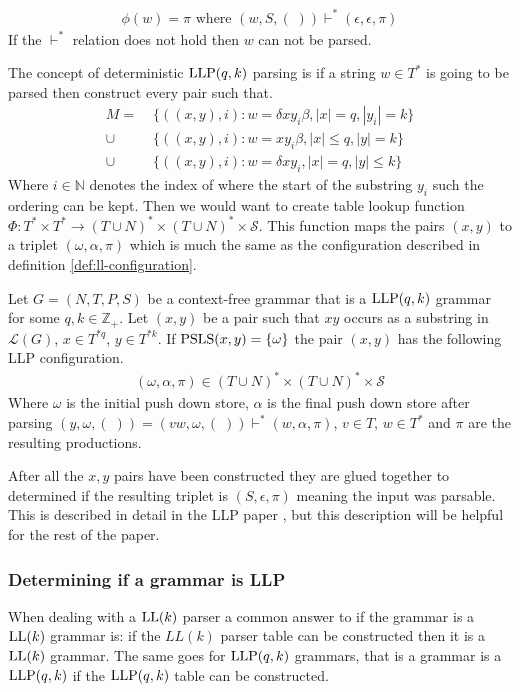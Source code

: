 \begin{align*}
    \phi(w) = \pi \text{ where } (w, S, (\;)) \vdash^* (\epsilon, \epsilon, \pi) 
\end{align*}
If the $\vdash^*$ relation does not hold then $w$ can not be parsed. 

The concept of deterministic $\text{LLP}(q,k)$ parsing is if a string $w \in T^*$ is going to be parsed then construct every pair such that.
\begin{align*}
    M =&\; \{((x, y), i) : w = \delta xy_i \beta, |x| = q, |y_i| = k\} \\
    \cup&\; \{((x, y), i) : w = xy_i \beta, |x| \leq q, |y| = k\} \\
    \cup&\; \{((x, y), i) : w = \delta xy_i, |x| = q, |y| \leq k\}
\end{align*}
Where $i \in \mathbb{N}$ denotes the index of where the start of the substring $y_i$ such the ordering can be kept. Then we would want to create table lookup function $\Phi: T^* \times T^* \to (T \cup N)^* \times (T \cup N)^* \times \mathcal{S}$. This function maps the pairs $(x,y)$ to a triplet $(\omega, \alpha, \pi)$ which is much the same as the configuration described in definition \ref{def:ll-configuration}. 
\begin{definition}
    \label{def:llp-configuration}
    Let $G = (N, T, P, S)$ be a context-free grammar that is a $\text{LLP}(q, k)$ grammar for some $q, k \in \mathbb{Z}_+$. Let $(x, y)$ be a pair such that $xy$ occurs as a substring in $\mathcal{L}(G)$, $x \in T^{*q}$, $y \in T^{*k}$. If $\text{PSLS}(x,y) = \{\omega\}$ the pair $(x, y)$ has the following LLP configuration.
    \begin{align*}
        (\omega, \alpha, \pi) \in (T \cup N)^* \times (T \cup N)^* \times \mathcal{S}
    \end{align*}
    Where $\omega$ is the initial push down store, $\alpha$ is the final push down store after parsing $(y, \omega, (\;)) = (vw, \omega, (\;)) \vdash^* (w, \alpha, \pi)$, $v \in T$, $w \in T^*$ and $\pi$ are the resulting productions.
\end{definition}
\noindent After all the $x, y$ pairs have been constructed they are glued together to determined if the resulting triplet is $(S, \epsilon, \pi)$ meaning the input was parsable. This is described in detail in the LLP paper \cite[7]{Vagner2007}, but this description will be helpful for the rest of the paper.

\subsubsection{Determining if a grammar is LLP}
When dealing with a $\text{LL}(k)$ parser a common answer to if the grammar is a $\text{LL}(k)$ grammar is: if the $LL(k)$ parser table can be constructed then it is a $\text{LL}(k)$ grammar. The same goes for $\text{LLP}(q,k)$ grammars, that is a grammar is a $\text{LLP}(q,k)$ if the $\text{LLP}(q, k)$ table can be constructed.

